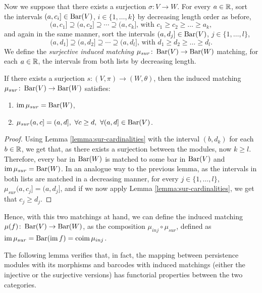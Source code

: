 Now we suppose that there exists a surjection $ \sigma\colon V \to W $. For every $ a \in \mathbb R$, sort the intervals $(a, c_i] \in \operatorname{Bar}(V) $, $i \in \{1, \dots, k\} $ by decreasing length order as before,
$$
    (a, c_1] \supseteq (a, c_2] \supseteq \cdots \supseteq (a, c_k] \text{, with } c_1 \geq c_2 \geq \dots \geq a_k,
$$
and again in the same manner, sort the intervals $(a, d_j] \in \operatorname{Bar}(V) $, $j \in \{1, \dots, l\} $,
$$
    (a, d_1] \supseteq (a, d_2] \supseteq \cdots \supseteq (a, d_l] \text{, with } d_1 \geq d_2 \geq \dots \geq d_l.
$$
We define the {\it surjective induced matching} $\mu_{sur}\colon \operatorname{Bar}(V) \to \operatorname{Bar}(W) $ matching, for each $ a \in \mathbb R $, the intervals from both lists by decreasing length.

\begin{lemma} \cite[Exercise 3.1.8]{polterovich} \label{lemma:sur-matching}
    If there exists a surjection $s\colon (V, \pi) \to (W, \theta) $, then the induced matching $ \mu_{sur}\colon \operatorname{Bar}(V) \to \operatorname{Bar} (W) $ satisfies:
    \begin{enumerate}
        \item $\operatorname{im} \mu_{sur} = \operatorname{Bar}(W)$,
        \item $\mu_{sur}(a, c] = (a, d], \ \forall c \geq d, \ \forall (a, d] \in \operatorname{Bar}(V)$.
    \end{enumerate}
\end{lemma}
\begin{proof}
    Using Lemma \ref{lemma:sur-cardinalities} with the interval $(b, d_k)$ for each $ b \in \mathbb R $, we get that, as there exists a surjection between the modules, now $ k \geq l $. Therefore, every bar in $\operatorname{Bar}(W)$ is matched to some bar in $\operatorname{Bar}(V)$ and $\operatorname{im} \mu_{sur} = \operatorname{Bar}(W)$. In an analogue way to the previous lemma, as the intervals in both lists are matched in a decreasing manner, for every $j \in \{1, \dots, l\} $, $\mu_{sur}(a, c_j] = (a, d_j] $, and if we now apply Lemma \ref{lemma:sur-cardinalities}, we get that $ c_j \geq d_j $.
\end{proof}

Hence, with this two matchings at hand, we can define the {induced matching} $ \mu(f)\colon \operatorname{Bar}(V) \to \operatorname{Bar}(W) $, as the composition $ \mu_{inj} \circ \mu_{sur} $, defined as $ \operatorname{im} \mu_{sur} = \operatorname{Bar}(\operatorname{im} f) = \operatorname{coim} \mu_{inj} $.

The following lemma verifies that, in fact, the mapping between persistence modules with its morphisms and barcodes with induced matchings (either the injective or the surjective versions) has functorial properties between the two categories.

